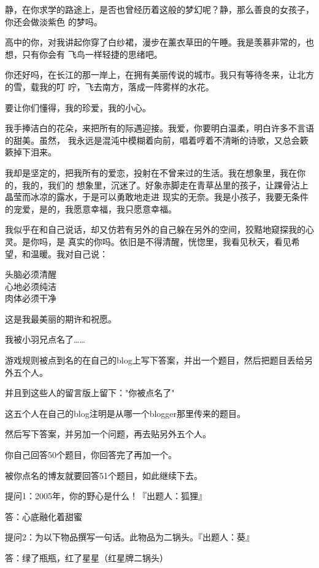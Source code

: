 \documentclass[12pt,a4paper]{article}
\def\blankrev{\vspace{1ex}}									%
\begin{document}
		静，在你求学的路途上，是否也曾经历着这般的梦幻呢？静，那么善良的女孩子，你还会做淡紫色
	的梦吗。

		高中的你，对我讲起你穿了白纱裙，漫步在薰衣草田的午睡。我是羡慕非常的，也想，只有你会有
	飞鸟一样轻捷的思绪吧。

		你还好吗，在长江的那一岸上，在拥有美丽传说的城市。我只有等待冬来，让北方的雪，载我的叮
	咛，飞去南方，落成一阵雾样的水花。


		\blankrev
		要让你们懂得，我的珍爱，我的小心。

		我手捧洁白的花朵，来把所有的际遇迎接。我爱，你要明白温柔，明白许多不言语的甜美。虽然，
	我永远是混沌中模糊着向前，唱着哼着不清晰的诗歌，又总会簌簌掉下泪来。

		我却是坚定的，把我所有的爱恋，投射在不曾来过的生活。我在想象里，我在你的，我的，我们的
	想象里，沉迷了。好象赤脚走在青草丛里的孩子，让踝骨沾上晶莹而冰凉的露水，于是可以勇敢地走进
	现实的无奈。我是小孩子，我要无条件的宠爱，是的，我愿意幸福，我只愿意幸福。

		我似乎在和自己说话，却又仿若有另外的自己躲在另外的空间，狡黠地窥探我的心灵。是你吗，是
	真实的你吗。依旧是不得清醒，恍惚里，我看见秋天，看见希望，和温暖。我对自己说：

		\longpoem{}{}{}
		头脑必须清醒 \\
		心地必须纯洁 \\
		肉体必须干净
		\endlongpoem

		这是我最美丽的期许和祝愿。

	\endwriting



		我被小羽兄点名了……

		游戏规则被点到名的在自己的blog上写下答案，并出一个题目，然后把题目丢给另外五个人。\par
		并且到这些人的留言版上留下："你被点名了"\par
		这五个人在自己的blog注明是从哪一个blogger那里传来的题目。\par
		然后写下答案，并另加一个问题，再去贴另外五个人。\par
		你自己回答50个题目，你回答完了再加一个。\par
		被你点名的博友就要回答51个题目，如此继续下去。


		提问1：2005年，你的野心是什么！『出题人：狐狸』\par
		答：心底融化着甜蜜

		\blankrev
		提问2：为以下物品撰写一句话。此物品为二锅头。『出题人：葵』\par
		答：绿了瓶瓶，红了星星（红星牌二锅头）
\end{document}
